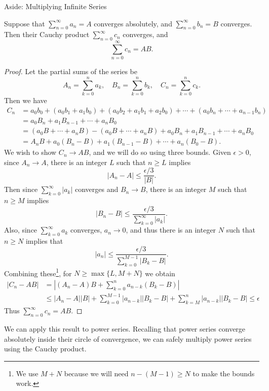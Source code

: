 \begin{aside}{Aside: Multiplying Infinite Series}
\begin{theorem*}
	Suppose that $\sum_{n = 0}^{\infty} a_n = A$ converges absolutely, and $\sum_{n = 0}^{\infty} b_n = B$ converges. Then their Cauchy product $\sum_{n = 0}^{\infty} c_n$ converges, and 
	$$
	\sum_{n = 0}^{\infty} c_n = AB.
	$$
\end{theorem*}
\begin{proof}
	Let the partial sums of the series be
	$$
	A_n = \sum_{k = 0}^{n} a_k, \quad B_n = \sum_{k = 0}^{n} b_k, \quad C_n = \sum_{k = 0}^{n} c_k.
	$$
	Then we have
	\begin{align*}
		C_n &= a_0 b_0 + (a_0 b_1 + a_1 b_0) + (a_0 b_2 + a_1 b_1 + a_2 b_0) + \cdots + (a_0 b_n + \cdots + a_{n - 1} b_n) \\
		&= a_0 B_n + a_1 B_{n - 1} + \cdots + a_n B_0 \\
		&= (a_0 B + \cdots + a_n B) - (a_0 B + \cdots + a_n B) + a_0 B_n + a_1 B_{n - 1} + \cdots + a_n B_0 \\
		&= A_n B + a_0 (B_n - B) + a_1 (B_{n-1} - B) + \cdots + a_n(B_0 - B).
	\end{align*}
	We wish to show $C_n \rightarrow AB$, and we will do so using three bounds. Given $\epsilon > 0$, since $A_n \rightarrow A$, there is an integer $L$ such that $n \geq L$ implies
	$$
	|A_n - A| \leq \frac{\epsilon /3}{|B|}.
	$$
	Then since $\sum_{k = 0}^{\infty} |a_k|$ converges and $B_n \rightarrow B$, there is an integer $M$ such that $n \geq M$ implies
	$$
	|B_n - B| \leq \frac{\epsilon/3}{\sum_{k = 0}^{\infty} |a_k|}.
	$$
	Also, since $\sum_{k = 0}^{\infty} a_k$ converges, $a_n \rightarrow 0$, and thus there is an integer $N$ such that $n \geq N$ implies that
	$$
	|a_n| \leq \frac{\epsilon/3}{\sum_{k = 0}^{M-1} |B_k - B|}.
	$$
	Combining these\footnote{We use $M + N$ because we will need $n - (M - 1) \geq N$ to make the bounds work.}, for $N \geq \max\{L, M + N\}$ we obtain
	\begin{align*}
		|C_n - AB| &= \left|(A_n - A)B + \sum_{k = 0}^n a_{n - k} (B_k - B)\right| \\
		&\leq |A_n - A||B| + \sum_{k = 0}^{M - 1}|a_{n - k}| |B_k - B| + \sum_{k = M}^{n} |a_{n -k}| |B_{k} - B| \leq \epsilon
	\end{align*}
	Thus $\sum_{n = 0}^{\infty} c_n = AB$. \qedhere
\end{proof}

We can apply this result to power series. Recalling that power series converge absolutely inside their circle of convergence, we can safely multiply power series using the Cauchy product.


\end{aside}
